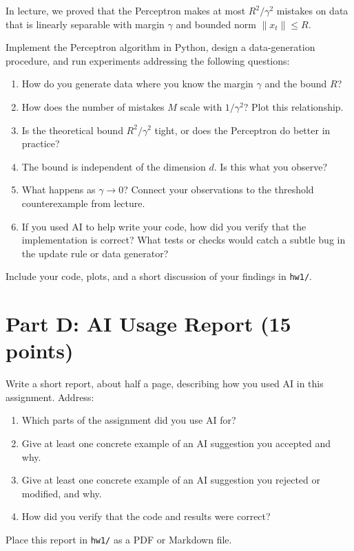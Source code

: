 \documentclass{article}
\begin{document}
In lecture, we proved that the Perceptron makes at most $R^2/\gamma^2$ mistakes on data that is linearly separable with margin $\gamma$ and bounded norm $\|x_t\| \le R$.

Implement the Perceptron algorithm in Python, design a data-generation procedure, and run experiments addressing the following questions:

\begin{enumerate}
\item How do you generate data where you know the margin $\gamma$ and the bound $R$?
\item How does the number of mistakes $M$ scale with $1/\gamma^2$? Plot this relationship.
\item Is the theoretical bound $R^2/\gamma^2$ tight, or does the Perceptron do better in practice?
\item The bound is independent of the dimension $d$. Is this what you observe?
\item What happens as $\gamma \to 0$? Connect your observations to the threshold counterexample from lecture.
\item If you used AI to help write your code, how did you verify that the implementation is correct? What tests or checks would catch a subtle bug in the update rule or data generator?
\end{enumerate}

Include your code, plots, and a short discussion of your findings in \texttt{hw1/}.

\section{Part D: AI Usage Report (15 points)}

Write a short report, about half a page, describing how you used AI in this assignment. Address:

\begin{enumerate}
\item Which parts of the assignment did you use AI for?
\item Give at least one concrete example of an AI suggestion you accepted and why.
\item Give at least one concrete example of an AI suggestion you rejected or modified, and why.
\item How did you verify that the code and results were correct?
\end{enumerate}

Place this report in \texttt{hw1/} as a PDF or Markdown file.
\end{document}
